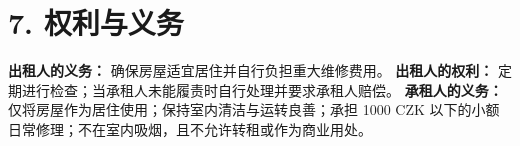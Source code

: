 \section*{7. 权利与义务}
\textbf{出租人的义务：} 确保房屋适宜居住并自行负担重大维修费用。
\textbf{出租人的权利：} 定期进行检查；当承租人未能履责时自行处理并要求承租人赔偿。
\textbf{承租人的义务：} 仅将房屋作为居住使用；保持室内清洁与运转良善；承担 1000 CZK 以下的小额日常修理；不在室内吸烟，且不允许转租或作为商业用处。
